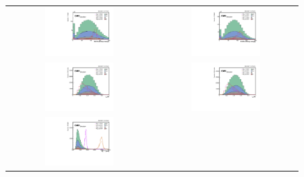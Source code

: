 \begin{figure}[t]
  \centering
  \begin{tabular}{cc}
    \includegraphics[width=0.5\textwidth]{Figures/MC_N1/puppiSDMassThea_j0.pdf} &
    \includegraphics[width=0.5\textwidth]{Figures/MC_N1/puppiSDMassThea_j1.pdf} \\
     \includegraphics[width=0.5\textwidth]{Figures/MC_N1/puppiTau21_j0.pdf} &
    \includegraphics[width=0.5\textwidth]{Figures/MC_N1/puppiTau21_j1.pdf} \\
     \includegraphics[width=0.5\textwidth]{Figures/MC_N1/totalMassRed.pdf} &

\end{tabular}
\end{figure}
